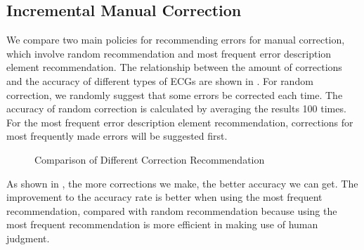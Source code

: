 \subsection{Incremental Manual Correction}
We compare two main policies for recommending errors for manual correction, 
which involve random recommendation and most frequent error 
description element recommendation. The relationship between the 
amount of corrections and the accuracy of different types of 
ECGs are shown in . For random correction, 
we randomly suggest that some errors be corrected each time. 
The accuracy of random correction is calculated by averaging 
the results 100 times. For the most frequent error 
description element recommendation, 
corrections for most frequently made errors will be suggested first. 

\begin{figure*}[ht]
\centering
{}
{}
\hfill
{}
{}
\caption{Comparison of Different Correction Recommendation}
\label{fig:humancorr}
\end{figure*}


As shown in , the more corrections we make, the better accuracy 
we can get. 
The improvement to the accuracy rate is better 
when using the most frequent recommendation, compared with random 
recommendation because using the most 
frequent recommendation is more efficient in making use of human judgment. 


